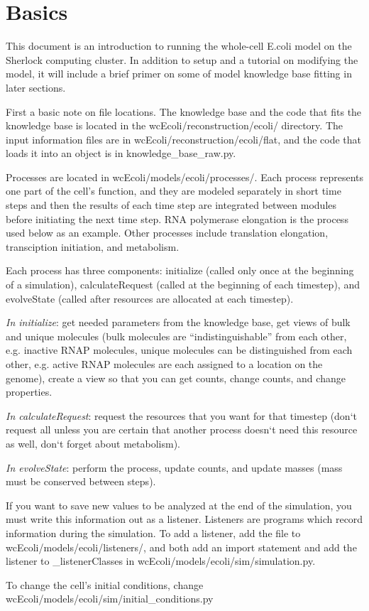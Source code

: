 \documentclass[12pt]{article}
\begin{document}
\maketitle

\section{Basics}

This document is an introduction to running the whole-cell E.coli model on the Sherlock computing cluster. In addition to setup and a tutorial on modifying the model, it will include a brief primer on some of model knowledge base fitting in later sections.
\par
First a basic note on file locations. The knowledge base and the code that fits the knowledge base is located in the wcEcoli/reconstruction/ecoli/ directory. The input information files are in wcEcoli/reconstruction/ecoli/flat, and the code that loads it into an object is in knowledge\_base\_raw.py.
\par

Processes are located in wcEcoli/models/ecoli/processes/. Each process represents one part of the cell's function, and they are modeled separately in short time steps and then the results of each time step are integrated between modules before initiating the next time step. RNA polymerase elongation is the process used below as an example. Other processes include translation elongation, transciption initiation, and metabolism.
\par
Each process has three components: initialize (called only once at the beginning of a simulation), calculateRequest (called at the beginning of each timestep), and evolveState (called after resources are allocated at each timestep).
\par
\emph{In initialize}: get needed parameters from the knowledge base, get views of bulk and unique molecules (bulk molecules are “indistinguishable” from each other, e.g. inactive RNAP molecules, unique molecules can be distinguished from each other, e.g. active RNAP molecules are each assigned to a location on the genome), create a view so that you can get counts, change counts, and change properties.
\par
\emph{In calculateRequest}: request the resources that you want for that timestep (don`t request all unless you are certain that another process doesn`t need this resource as well, don`t forget about metabolism).
\par
\emph{In evolveState}: perform the process, update counts, and update masses (mass must be conserved between steps).
\par
If you want to save new values to be analyzed at the end of the simulation, you must write this information out as a listener. Listeners are programs which record information during the simulation. To add a listener, add the file to wcEcoli/models/ecoli/listeners/, and both add an import statement and add the listener to \_listenerClasses in wcEcoli/models/ecoli/sim/simulation.py.
\par
To change the cell’s initial conditions, change wcEcoli/models/ecoli/sim/initial\_conditions.py
\par
\end{document}
